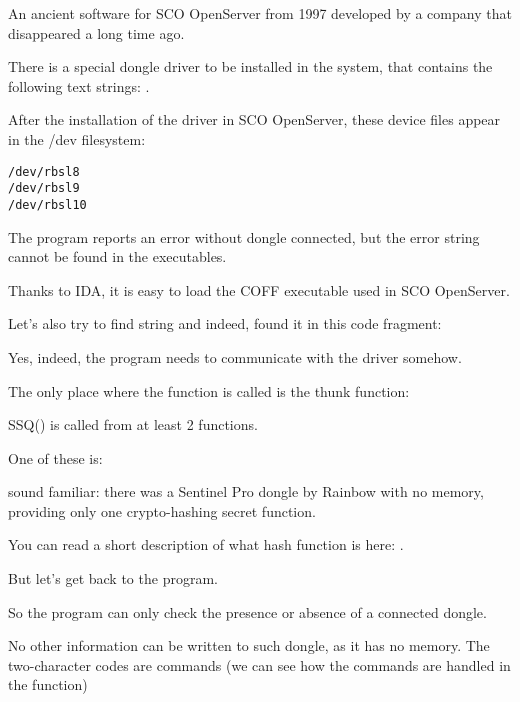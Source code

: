 
\label{examples_SCO}
An ancient software for SCO OpenServer from 1997 
developed
by a company that disappeared a long time ago.


There is a special dongle driver to be installed in the system, that contains the following text strings:
\AndENRU
{}.


After the installation of the driver in SCO OpenServer, these device files appear in the /dev filesystem:

\begin{lstlisting}
/dev/rbsl8
/dev/rbsl9
/dev/rbsl10
\end{lstlisting}


The program reports an error without dongle connected, but the error string cannot be found in the executables.


Thanks to \ac{IDA}, it is easy to load the COFF executable used in SCO OpenServer.

%
Let's also try to find  string and indeed, found it in this code fragment:




Yes, indeed, the program needs to communicate with the driver somehow.

The only place where the 
function is called is the \gls{thunk function}:



SSQ() 
is called from at least 2 functions.

One of these is:



 \AndENRU {} 
sound familiar: there was a Sentinel Pro dongle by Rainbow with no memory,
providing only one crypto-hashing secret function.

You can read a short description
of what hash function is here: .

But let's get back to the program.

So the program can only check the presence or absence of a connected dongle.

No other information can be written to such dongle, as it has no memory.
The two-character codes are commands
(we can see how the commands are handled in the 
 function) 

